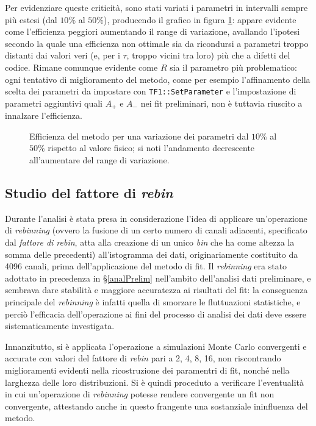 \documentclass[10pt, oneside, a4paper]{article}   	%
\begin{document}
Per evidenziare queste criticità, sono stati variati i parametri in intervalli sempre più estesi (dal $10\%$ al $50\%$), producendo il grafico in figura \ref{fig:finalematrix}: appare evidente come l'efficienza peggiori aumentando il range di variazione, avallando l'ipotesi secondo la quale una efficienza non ottimale sia da ricondursi a parametri troppo distanti dai valori veri (e, per i $\tau$, troppo vicini tra loro) più che a difetti del codice. Rimane comunque evidente come $R$ sia il parametro più problematico: ogni tentativo di miglioramento del metodo, come per esempio l'affinamento della scelta dei parametri da impostare con \lstinline{TF1::SetParameter} e l'impostazione di parametri aggiuntivi quali $A_+$ e $A_-$ nei fit preliminari, non è tuttavia riuscito a innalzare l'efficienza.
%
\begin{figure}[H]
  \centering
  
  \caption{Efficienza del metodo per una variazione dei parametri dal $10 \%$ al $50\%$ rispetto al valore fisico; si noti l'andamento decrescente all'aumentare del range di variazione.}
  \label{fig:finalematrix}
\end{figure}
%
%
\subsection{Studio del fattore di \emph{rebin}} \label{parrebin}
Durante l'analisi è stata presa in considerazione l'idea di applicare un'operazione di \textit{rebinning} (ovvero la fusione di un certo numero di canali adiacenti, specificato dal \textit{fattore di rebin}, atta alla creazione di un unico \emph{bin} che ha come altezza la somma delle precedenti) all'istogramma dei dati, originariamente costituito da 4096 canali, prima dell'applicazione del metodo di fit. Il \textit{rebinning} era stato adottato in precedenza in \S\ref{analPrelim} nell'ambito dell'analisi dati preliminare, e sembrava dare stabilità e maggiore accuratezza ai risultati del fit: la conseguenza principale del \textit{rebinning} è infatti quella di smorzare le fluttuazioni statistiche, e perciò l'efficacia dell'operazione ai fini del processo di analisi dei dati deve essere sistematicamente investigata.

Innanzitutto, si è applicata l'operazione a simulazioni Monte Carlo convergenti e accurate con valori del fattore di \emph{rebin} pari a 2, 4, 8, 16, non riscontrando miglioramenti evidenti nella ricostruzione dei paramentri di fit, nonché nella larghezza delle loro distribuzioni. Si è quindi proceduto a verificare l'eventualità in cui un'operazione di \textit{rebinning} potesse rendere convergente un fit non convergente, attestando anche in questo frangente una sostanziale ininfluenza del metodo.
\end{document}
